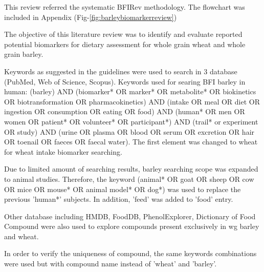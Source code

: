 This review referred the systematic BFIRev methodology\cite{Pratico2018}. The flowchart was included in Appendix (Fig-\ref{fig:barleybiomarkerreview})

The objective of this literature review was to identify and evaluate reported potential biomarkers for dietary assessment for whole grain wheat and whole grain barley.

Keywords as suggested in the guidelines\cite{Pratico2018} were used to search in 3 database (PubMed, Web of Science, Scopus). Keywords used for searing BFI barley in human: 
(barley) AND (biomarker* OR marker* OR metabolite* OR biokinetics OR biotransformation OR pharmacokinetics) AND (intake OR meal OR diet OR ingestion OR consumption OR eating OR food) AND 
(human* OR men OR women OR patient* OR volunteer* OR participant*) AND 
(trail* or experiment OR study) AND (urine OR plasma OR blood OR serum OR excretion OR hair OR toenail OR faeces OR faecal water). The first element was changed to wheat for wheat intake biomarker searching. 

Due to limited amount of searching results, barley searching scope was expanded to animal studies. Therefore, the keyword (animal* OR goat OR sheep OR cow OR mice OR mouse* OR animal model* OR dog*) was used to replace the previous 'human*' subjects. In addition, 'feed' was added to 'food' entry.

Other database including HMDB\cite{hmdb}, FoodDB\cite{foodb}, PhenolExplorer\cite{phenolexplorer}, Dictionary of Food Compound\cite{dictionary} were also used to explore compounds present exclusively in \acrshort{wg} barley and wheat. 

In order to verify the uniqueness of compound, the same keywords combinations were used but with compound name instead of 'wheat' and 'barley'.